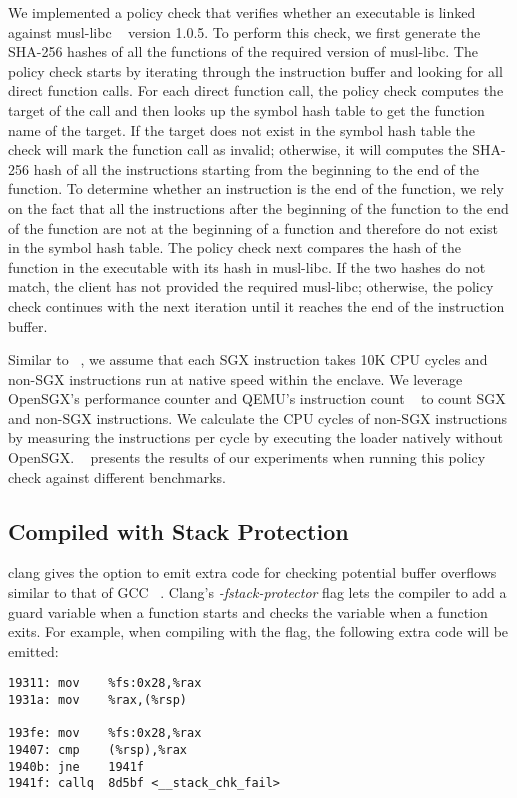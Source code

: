 We implemented a policy check that verifies whether an executable is linked against musl-libc 
~\cite{musl-libc} version 1.0.5. To perform this check, we first generate the SHA-256 hashes of all 
the functions of the required version of musl-libc. The policy check starts by iterating through the 
instruction buffer and looking for all direct function calls. For each direct function call, the 
policy check computes the target of the call and then looks up the symbol hash table to get the 
function name of the target. If the target does not exist in the symbol hash table the check will 
mark the function call as invalid; otherwise, it will computes the SHA-256 hash of all the 
instructions starting from the beginning to the end of the function. To determine whether an 
instruction is the end of the function, we rely on the fact that all the instructions after the 
beginning of the function to the end of the function are not at the beginning of a function and 
therefore do not exist in the symbol hash table. The policy check next compares the hash of the 
function in the executable with its hash in musl-libc. If the two hashes do not match, the client 
has not provided the required musl-libc; otherwise, the policy check continues with the next 
iteration until it reaches the end of the instruction buffer.

Similar to ~\cite{OpenSGX}, we assume that each SGX instruction takes 10K CPU cycles and non-SGX 
instructions run at native speed within the enclave. We leverage OpenSGX's performance counter and 
QEMU's instruction count ~\cite{http://wiki.qemu.org/download/qemu-doc.html} to count SGX and non-SGX 
instructions. We calculate the CPU cycles of non-SGX instructions by measuring the instructions per 
cycle by executing the loader natively without OpenSGX. ~ presents 
the results of our experiments when running this policy check against different benchmarks.  

\subsection{Compiled with Stack Protection}

clang gives the option to emit extra code for checking potential buffer overflows similar to that of 
GCC ~\cite{https://gcc.gnu.org/onlinedocs/gcc-4.9.2/gcc/Optimize-Options.html}. Clang's 
\textit{-fstack-protector} flag lets the compiler to add a guard variable when a function starts and 
checks the variable when a function exits. For example, when compiling with the flag, the following 
extra code will be emitted:
\begin{lstlisting}
19311: mov    %fs:0x28,%rax
1931a: mov    %rax,(%rsp)

193fe: mov    %fs:0x28,%rax
19407: cmp    (%rsp),%rax
1940b: jne    1941f
1941f: callq  8d5bf <__stack_chk_fail>
\end{lstlisting}

